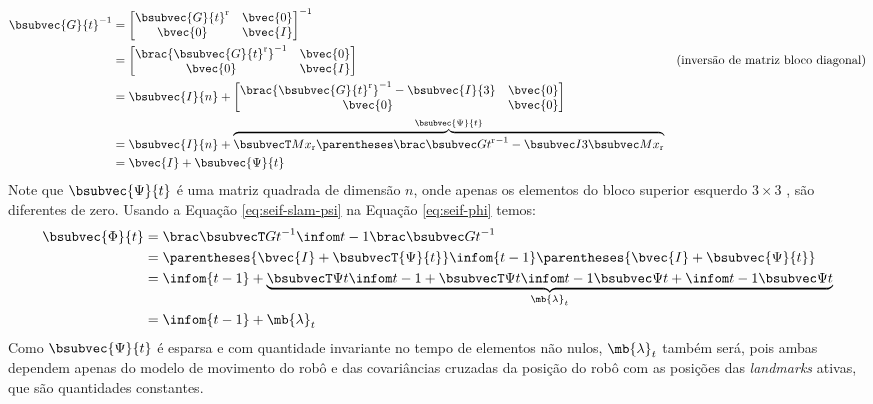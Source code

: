 \begin{equation}
\begin{aligned}
  \bsubvec{G}{t}^{-1} &= \begin{bmatrix}
    \bsubvec{G}{t}^\mathrm{r} & \bvec{0} \\
    \bvec{0} & \bvec{I}
  \end{bmatrix}^{-1} \\
  &= \begin{bmatrix}
    \brac{\bsubvec{G}{t}^\mathrm{r}}^{-1} & \bvec{0} \\
    \bvec{0} & \bvec{I} 
  \end{bmatrix} & \text{(inversão de matriz bloco diagonal)} \\
  &= \bsubvec{I}{n} + \begin{bmatrix}
    \brac{\bsubvec{G}{t}^\mathrm{r}}^{-1} - \bsubvec{I}{3} & \bvec{0} \\
    \bvec{0} & \bvec{0}
  \end{bmatrix} \\
  &= \bsubvec{I}{n} + \overbrace{\psitvalue}^{\bsubvec{\Psi}{t}} \\
  &= \bvec{I} + \bsubvec{\Psi}{t} 
\end{aligned}
\label{eq:seif-slam-psi}
\end{equation}
Note que $\bsubvec{\Psi}{t}$ é uma matriz quadrada de dimensão $n$, onde apenas os 
elementos do bloco superior esquerdo $3\times 3$ , são diferentes de zero. Usando a Equação \ref{eq:seif-slam-psi} na Equação \ref{eq:seif-phi} temos:
\begin{equation}
\begin{aligned}
  \bsubvec{\Phi}{t} &= \seifPhi \\
  &= \parentheses{\bvec{I} + \bsubvecT{\Psi}{t}} \infom{t-1} \parentheses{\bvec{I} + \bsubvec{\Psi}{t}} \\
  &= \infom{t-1} + \underbrace{\lambdatvalue}_{\mb{\lambda}_t} \\
  &= \infom{t-1} + \mb{\lambda}_t
\end{aligned}
\end{equation}
Como $\bsubvec{\Psi}{t}$ é esparsa e com quantidade invariante no tempo de elementos não nulos, $\mb{\lambda}_t$ também será, pois ambas dependem apenas do modelo de movimento do robô e das 
covariâncias cruzadas da posição do robô com as posições das 
\textit{landmarks} ativas, que são quantidades constantes.


